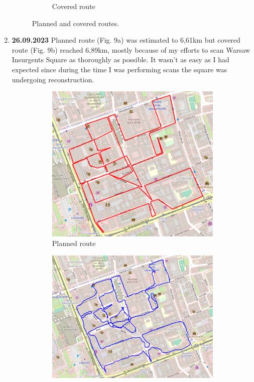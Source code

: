 \documentclass[a4paper,12pt]{article}
\begin{document}
\begin{enumerate}
\begin{figure}[H]
\begin{subfigure}{.75\textwidth}
			\caption{Covered route}
			\label{fig:b7}
		\end{subfigure}
		\caption{Planned and covered routes.}
		\label{fig:fig7}
	\end{figure} 
	\item \textbf{26.09.2023} Planned route (Fig. 9a) was estimated to 6,61km but covered route (Fig. 9b) reached 6,89km, mostly because of my efforts to scan Warsaw Insurgents Square as thoroughly as possible. It wasn't as easy as I had expected since during the time I was performing scans the square was undergoing reconstruction.
	\begin{figure}[H]
		\centering
		\begin{subfigure}{.83\textwidth}
			\centering
			\includegraphics[width=1\linewidth]{route_p8}
			\caption{Planned route}
			\label{fig:a8}
		\end{subfigure}%
		\linebreak
		\begin{subfigure}{.83\textwidth}
			\centering
			\includegraphics[width=1\linewidth]{route_c8}

\end{subfigure}
\end{figure}
\end{enumerate}
\end{document}
